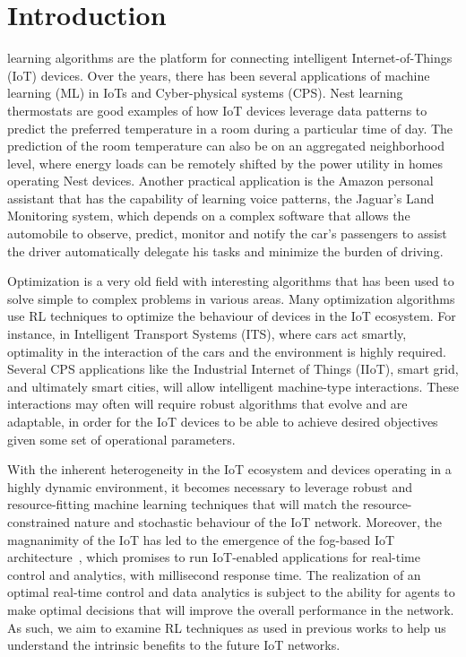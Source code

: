 \documentclass[journal]{IEEEtran}
\begin{document}
%
\IEEEpeerreviewmaketitle

\section{Introduction}
\label{sec:Introduction}
 learning algorithms are the platform for connecting intelligent Internet-of-Things (IoT) devices. Over the years, there has been several applications of machine learning (ML) in IoTs and Cyber-physical systems (CPS). Nest learning thermostats are good examples of how IoT devices leverage data patterns to predict the preferred temperature in a room during a particular time of day. The prediction of the room temperature can also be on an aggregated neighborhood level, where energy loads can be remotely shifted by the power utility in homes operating Nest devices. Another practical application is the Amazon personal assistant that has the capability of learning voice patterns, the Jaguar's Land Monitoring system, which depends on a complex software that allows the automobile to observe, predict, monitor and notify the car's passengers to assist the driver automatically delegate his tasks and minimize the burden of driving.

Optimization is a very old field with interesting algorithms that has been used to solve simple to complex problems in various areas. Many optimization algorithms use RL techniques to optimize the behaviour of devices in the IoT ecosystem. For instance, in Intelligent Transport Systems (ITS), where cars act smartly, optimality in the interaction of the cars and the environment is highly required. Several CPS applications like the Industrial Internet of Things (IIoT), smart grid, and ultimately smart cities, will allow intelligent machine-type interactions. These interactions may often will require robust algorithms that evolve and are adaptable, in order for the IoT devices to be able to achieve desired objectives given some set of operational parameters.

With the inherent heterogeneity in the IoT ecosystem and devices operating in a highly dynamic environment, it becomes necessary to leverage robust and resource-fitting machine learning techniques that will match the resource-constrained nature and stochastic behaviour of the IoT network. Moreover, the magnanimity of the IoT has led to the emergence of the fog-based IoT architecture~\cite{Omoniwa2018}, which promises to run IoT-enabled applications for real-time control and analytics, with millisecond response time. The realization of an optimal real-time control and data analytics is subject to the ability for agents to make optimal decisions that will improve the overall performance in the network. As such, we aim to examine RL techniques as used in previous works to help us understand the intrinsic benefits to the future IoT networks.
\end{document}

